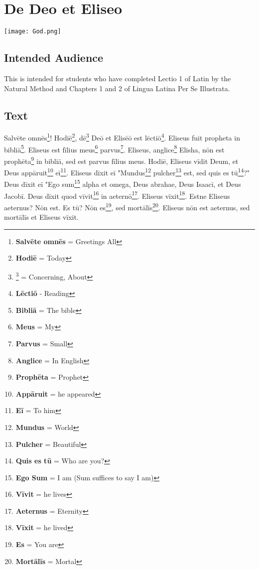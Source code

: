 \chapter{De Deo et Eliseo}
\begin{center}
\texttt{[image: God.png]}
\end{center}

\section{Intended Audience}
This is intended for students who have completed Lectio 1 of Latin by the Natural Method and Chapters 1 and 2 of Lingua Latina Per Se Illustrata.

\section{Text}
Salvēte omnēs\footnote{\textbf{Salvēte omnēs} = Greetings All}! Hodiē\footnote{\textbf{Hodiē} = Today}, dē\footnote{\footnote{Dē} = Concerning, About} Deō et Elisēō est lēctiō\footnote{\textbf{Lēctiō} - Reading}. Eliseus fuit propheta in bibliā\footnote{\textbf{Bibliā} = The bible}. Eliseus est fīlius meus\footnote{\textbf{Meus} = My} parvus\footnote{\textbf{Parvus} = Small}. Eliseus, anglice\footnote{\textbf{Anglice} = In English} Elisha, nōn est prophēta\footnote{\textbf{Prophēta} = Prophet} in bibliā, sed est parvus fīlius meus. Hodiē, Eliseus vīdit Deum, et Deus appāruit\footnote{\textbf{Appāruit} = he appeared} eī\footnote{\textbf{Eī} = To him}. Eliseus dīxit eī "Mundus\footnote{\textbf{Mundus} = World} pulcher\footnote{\textbf{Pulcher} = Beautiful} est, sed quis es tū\footnote{\textbf{Quis es tū} = Who are you?}?" Deus dīxit eī "Ego sum\footnote{\textbf{Ego Sum} = I am (Sum suffices to say I am)} alpha et omega, Deus abrahae, Deus Isaacī, et Deus Jacobī. Deus dīxit quod vīvit\footnote{\textbf{Vīvit} = he lives} in aeternō\footnote{\textbf{Aeternus} = Eternity}. Eliseus vīxit\footnote{\textbf{Vīxit} = he lived}. Estne Eliseus aeternus? Nōn est. Es tū? Nōn es\footnote{\textbf{Es} = You are}, sed mortālīs\footnote{\textbf{Mortālīs} = Mortal}. Eliseus nōn est aeternus, sed mortālīs et Eliseus vīxit. \par
